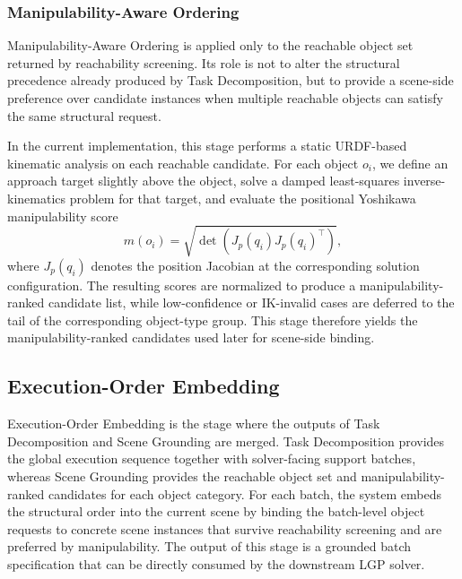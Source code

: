 \documentclass[journal]{IEEEtran}
\begin{document}
  \subsubsection{Manipulability-Aware Ordering}
  \label{subsec:phase0_manip}

  Manipulability-Aware Ordering is applied only to the reachable object set returned by
  reachability screening. Its role is not to alter the structural precedence already
  produced by Task Decomposition, but to provide a scene-side preference over candidate
  instances when multiple reachable objects can satisfy the same structural request.

  In the current implementation, this stage performs a static URDF-based kinematic
  analysis on each reachable candidate. For each object $o_i$, we define an approach
  target slightly above the object, solve a damped least-squares inverse-kinematics
  problem for that target, and evaluate the positional Yoshikawa manipulability
  score~\cite{cite_manipulability_1985}
  \begin{equation}
    m(o_i) = \sqrt{\det\!\left(J_p(q_i)J_p(q_i)^\top\right)},
    \label{eq:manipulability}
  \end{equation}
  where $J_p(q_i)$ denotes the position Jacobian at the corresponding solution
  configuration. The resulting scores are normalized to produce a manipulability-ranked
  candidate list, while low-confidence or IK-invalid cases are deferred to the tail of
  the corresponding object-type group. This stage therefore yields the
  manipulability-ranked candidates used later for scene-side binding.

  \subsection{Execution-Order Embedding}
  \label{subsec:phase_embed}

  Execution-Order Embedding is the stage where the outputs of Task Decomposition and
  Scene Grounding are merged. Task Decomposition provides the global execution sequence
  together with solver-facing support batches, whereas Scene Grounding provides the
  reachable object set and manipulability-ranked candidates for each object category.
  For each batch, the system embeds the structural order into the current scene by
  binding the batch-level object requests to concrete scene instances that survive
  reachability screening and are preferred by manipulability. The output of this stage
  is a grounded batch specification that can be directly consumed by the downstream LGP
  solver.
\end{document}
